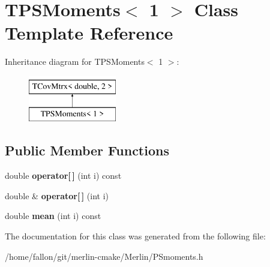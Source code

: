 \hypertarget{classTPSMoments_3_011_01_4}{}\section{T\+P\+S\+Moments$<$ 1 $>$ Class Template Reference}
\label{classTPSMoments_3_011_01_4}
Inheritance diagram for T\+P\+S\+Moments$<$ 1 $>$\+:\begin{figure}[H]
\begin{center}
\leavevmode
\includegraphics[height=2.000000cm]{classTPSMoments_3_011_01_4}
\end{center}
\end{figure}
\subsection*{Public Member Functions}
\begin{DoxyCompactItemize}
\item 
\mbox{\label{classTPSMoments_3_011_01_4_a84ad634878f9d8c54a3ea81d6fab2a9c}} 
double {\bfseries operator\mbox{[}$\,$\mbox{]}} (int i) const
\item 
\mbox{\label{classTPSMoments_3_011_01_4_aca4779058b896081ab2d2882c3774491}} 
double \& {\bfseries operator\mbox{[}$\,$\mbox{]}} (int i)
\item 
\mbox{\label{classTPSMoments_3_011_01_4_a2b4c52d9e8455986a7df9e691e75e1c0}} 
double {\bfseries mean} (int i) const
\end{DoxyCompactItemize}


The documentation for this class was generated from the following file\+:\begin{DoxyCompactItemize}
\item 
/home/fallon/git/merlin-\/cmake/\+Merlin/P\+Smoments.\+h\end{DoxyCompactItemize}
